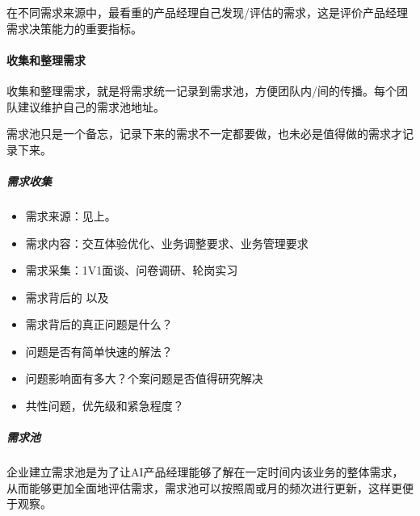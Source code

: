 \documentclass[letterpaper,10pt,english]{sphinxmanual}
\begin{document}
在不同需求来源中，最看重的产品经理自己发现/评估的需求，这是评价产品经理需求决策能力的重要指标。


\paragraph{收集和整理需求}
\label{\detokenize{chapter_knowledge/upgrade_manage:id11}}
收集和整理需求，就是将需求统一记录到需求池，方便团队内/间的传播。每个团队建议维护自己的需求池地址。

需求池只是一个备忘，记录下来的需求不一定都要做，也未必是值得做的需求才记录下来。


\subparagraph{需求收集}
\label{\detokenize{chapter_knowledge/upgrade_manage:id12}}\begin{itemize}
\item {} 
需求来源：见上。

\item {} 
需求内容：交互体验优化、业务调整要求、业务管理要求

\item {} 
需求采集：1V1面谈、问卷调研、轮岗实习

\item {} 
需求背后的  以及 

\item {} 
需求背后的真正问题是什么？

\item {} 
问题是否有简单快速的解法？

\item {} 
问题影响面有多大？个案问题是否值得研究解决

\item {} 
共性问题，优先级和紧急程度？

\end{itemize}


\subparagraph{需求池}
\label{\detokenize{chapter_knowledge/upgrade_manage:id13}}
企业建立需求池是为了让AI产品经理能够了解在一定时间内该业务的整体需求，从而能够更加全面地评估需求，需求池可以按照周或月的频次进行更新，这样更便于观察。
\end{document}
